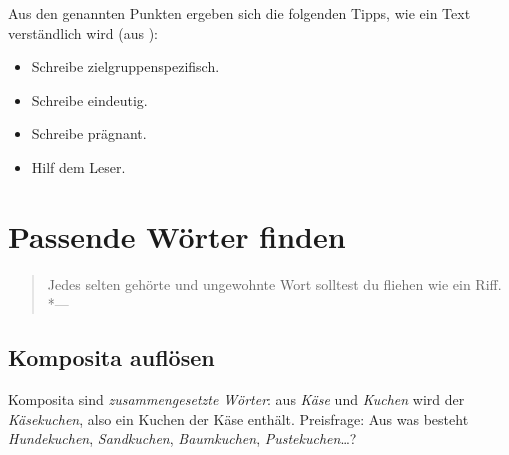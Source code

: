 \documentclass[a4paper,titlepage=true,twoside]{scrartcl}
\newenvironment{epigraph}[1]%
{\sbox{\Epigraph}{\textit{#1}}
\begin{quote}}%
{%
\\*\hspace{0pt}---\usebox{\Epigraph}%
\end{quote}}
\begin{document}
Aus den genannten Punkten ergeben sich die folgenden Tipps, wie ein Text
verständlich wird (aus \cite{bib.rosenberg}):

\begin{itemize}
 \item Schreibe zielgruppenspezifisch.
 \item Schreibe eindeutig.
 \item Schreibe prägnant.
 \item Hilf dem Leser.
\end{itemize}


%
%
%


\section{Passende Wörter finden}
\begin{epigraph}{Cäsar}
 Jedes selten gehörte und ungewohnte Wort solltest du fliehen wie ein Riff.
\end{epigraph}



\subsection{Komposita auflösen}
Komposita sind \emph{zusammengesetzte Wörter}: aus \emph{Käse} und \emph{Kuchen}
wird der \emph{Käsekuchen}, also ein Kuchen der Käse enthält. Preisfrage: Aus was
besteht \emph{Hundekuchen}, \emph{Sandkuchen}, \emph{Baumkuchen},
\emph{Pustekuchen}\ldots?
\end{document}
